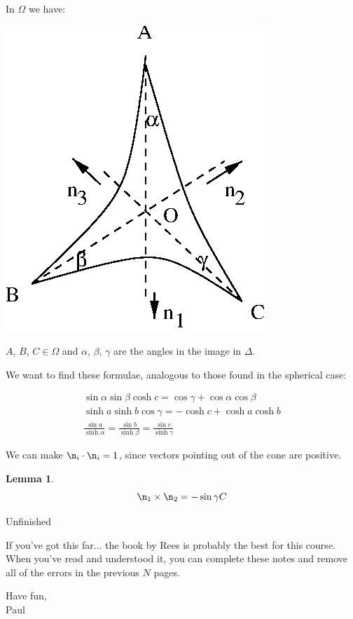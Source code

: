 \documentclass{notes}
\theoremstyle{plain}
\newtheorem{lemma}[proposition]{Lemma}
\begin{document}
In $\Omega$ we have:
\begin{center}
\includegraphics{htri4.eps}
\end{center}

$A$, $B$, $C \in \Omega$ and $\alpha$, $\beta$, $\gamma$ are the angles in the
image in $\Delta$.

We want to find these formulae, analogous to those found in the spherical case:

\begin{gather*}
\sin \alpha \sin \beta \cosh c = \cos \gamma + \cos \alpha \cos \beta \\
\sinh a \sinh b \cos \gamma = - \cosh c + \cosh a \cosh b \\
\frac{\sin a}{\sinh \alpha} = \frac{\sin b}{\sinh \beta} =
\frac{\sin c}{\sinh \gamma}
\end{gather*}

We can make $\n_i \cdot \n_i = 1$, since vectors pointing out of the
cone are positive.

\begin{lemma}
\[
\n_1 \times \n_2 = - \sin \gamma C
\]
\end{lemma}

\vspace{2in}

\begin{center}
\LARGE
Unfinished
\end{center}

If you've got this far... the book by Rees is probably the best for
this course.  When you've read and understood it, you can complete
these notes and remove all of the errors in the previous $N$ pages.

\begin{flushright}
\parbox{1in}{Have fun,\\Paul}
\end{flushright}
\end{document}
